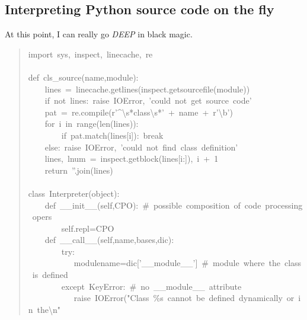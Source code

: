 \documentclass[10pt,english]{article}
\begin{document}

\hypertarget{interpreting-python-source-code-on-the-fly}{}
\subsection*{Interpreting Python source code on the fly}

At this point, I can really go \emph{DEEP} in black magic.
\begin{quote}
\begin{ttfamily}\begin{flushleft}
\mbox{import~sys,~inspect,~linecache,~re}\\
\mbox{}\\
\mbox{def~cls{\_}source(name,module):}\\
\mbox{~~~~lines~=~linecache.getlines(inspect.getsourcefile(module))}\\
\mbox{~~~~if~not~lines:~raise~IOError,~'could~not~get~source~code'}\\
\mbox{~~~~pat~=~re.compile(r'{\textasciicircum}{\textbackslash}s*class{\textbackslash}s*'~+~name~+~r'{\textbackslash}b')}\\
\mbox{~~~~for~i~in~range(len(lines)):}\\
\mbox{~~~~~~~~if~pat.match(lines[i]):~break}\\
\mbox{~~~~else:~raise~IOError,~'could~not~find~class~definition'}\\
\mbox{~~~~lines,~lnum~=~inspect.getblock(lines[i:]),~i~+~1}\\
\mbox{~~~~return~''.join(lines)}\\
\mbox{}\\
\mbox{class~Interpreter(object):}\\
\mbox{~~~~def~{\_}{\_}init{\_}{\_}(self,CPO):~{\#}~possible~composition~of~code~processing~opers}\\
\mbox{~~~~~~~~self.repl=CPO}\\
\mbox{~~~~def~{\_}{\_}call{\_}{\_}(self,name,bases,dic):}\\
\mbox{~~~~~~~~try:}\\
\mbox{~~~~~~~~~~~modulename=dic['{\_}{\_}module{\_}{\_}']~{\#}~module~where~the~class~is~defined}\\
\mbox{~~~~~~~~except~KeyError:~{\#}~no~{\_}{\_}module{\_}{\_}~attribute}\\
\mbox{~~~~~~~~~~~raise~IOError("Class~{\%}s~cannot~be~defined~dynamically~or~in~the{\textbackslash}n"}\\

\end{flushleft}
\end{ttfamily}
\end{quote}
\end{document}
